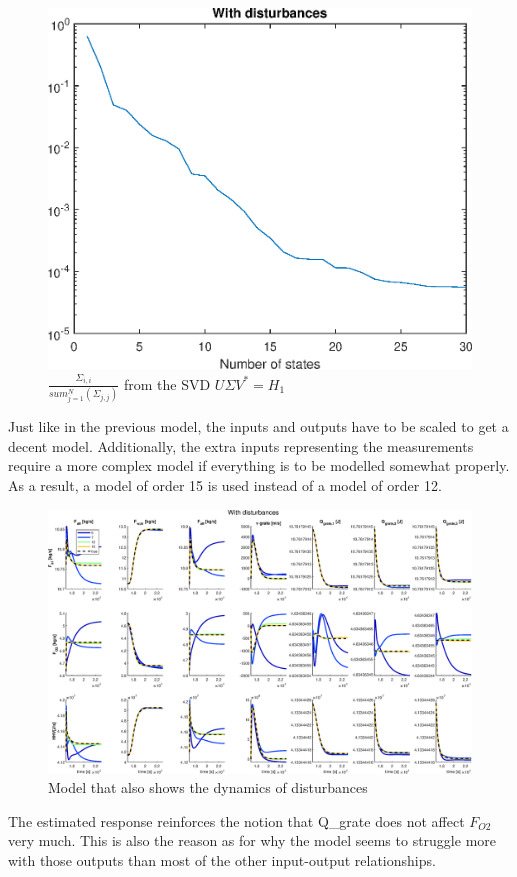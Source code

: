 \begin{figure}%
    \centering
    \includegraphics[width=\textwidth]{img/Fig_dump/Sigmas_with_disturbances.eps}
    \caption{$\frac{\Sigma_{i,i}}{sum_{j=1}^{N}(\Sigma_{j,j})}$ from the SVD $U\Sigma V^* = H_1$}
    \label{fig:ERA_distrubance_state_contributions}
\end{figure}



\noindent
Just like in the previous model, the inputs and outputs have to be scaled to get a decent model. Additionally, the extra inputs representing the measurements require a more complex model if everything is to be modelled somewhat properly. As a result, a model of order 15 is used instead of a model of order 12. 

\begin{figure}
    \centering
    \includegraphics[width=\textwidth]{img/Fig_dump/ERA_step_approx_with_disturbance_inputs.eps}
    \caption{Model that also shows the dynamics of disturbances}
    \label{fig:disturbance_proper_system_approx}
\end{figure}

\noindent 
The estimated response reinforces the notion that Q_grate does not affect $F_{O2}$ very much. This is also the reason as for why the model seems to struggle more with those outputs than most of the other input-output relationships. 


